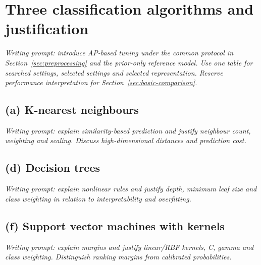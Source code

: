 \section{Three classification algorithms and justification}
\label{sec:classification-algorithms}

\emph{Writing prompt: introduce AP-based tuning under the common protocol in
Section~\ref{sec:preprocessing} and the prior-only reference model. Use one table
for searched settings, selected settings and selected representation. Reserve
performance interpretation for Section~\ref{sec:basic-comparison}.}

\subsection*{(a) K-nearest neighbours}
\emph{Writing prompt: explain similarity-based prediction and justify neighbour
count, weighting and scaling. Discuss high-dimensional distances and prediction cost.}

\subsection*{(d) Decision trees}
\emph{Writing prompt: explain nonlinear rules and justify depth, minimum leaf
size and class weighting in relation to interpretability and overfitting.}

\subsection*{(f) Support vector machines with kernels}
\emph{Writing prompt: explain margins and justify linear/RBF kernels, C, gamma
and class weighting. Distinguish ranking margins from calibrated probabilities.}

